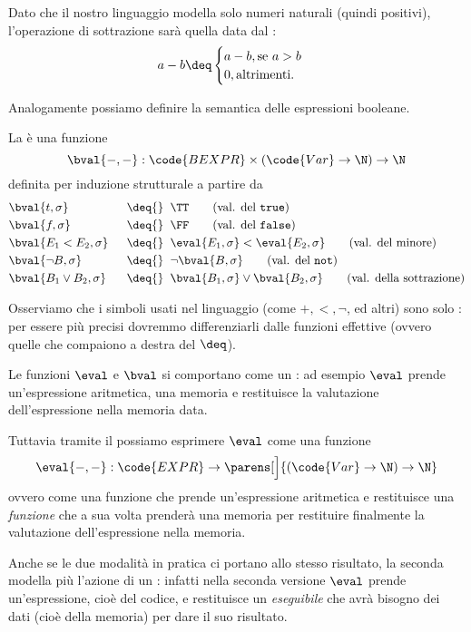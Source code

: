 Dato che il nostro linguaggio modella solo numeri naturali (quindi positivi), l'operazione di sottrazione sarà quella data dal : \[
    a - b \deq \begin{cases}
        a - b, \text{se } a > b\\
        0, \text{altrimenti.}
    \end{cases}
\]

Analogamente possiamo definire la semantica delle espressioni booleane.

\begin{definition}
    La  è una funzione \[
        \bval{\blank, \blank} : \code{BEXPR} \times (\code{Var} \to \N) \to \N
    \] definita per induzione strutturale a partire da
    \begin{alignat*}{2}
        &\bval{t, \sigma} &&\;\;\deq{}\;\; \TT \tag{val. del \texttt{true}}\\
        &\bval{f, \sigma} &&\;\;\deq{}\;\; \FF \tag{val. del \texttt{false}}\\
        &\bval{E_1 < E_2, \sigma} &&\;\;\deq{}\;\; \eval{E_1, \sigma} < \eval{E_2, \sigma} \tag{val. del minore}\\
        &\bval{\neg B, \sigma} &&\;\;\deq{}\;\; \neg \bval{B, \sigma}  \tag{val. del \texttt{not}}\\
        &\bval{B_1 \lor B_2, \sigma} &&\;\;\deq{}\;\; \bval{B_1, \sigma} \lor \bval{B_2, \sigma} \tag{val. della sottrazione}
    \end{alignat*}
\end{definition}

Osserviamo che i simboli usati nel linguaggio (come $+, <, \neg$, ed altri) sono solo : per essere più precisi dovremmo differenziarli dalle funzioni effettive (ovvero quelle che compaiono a destra del $\deq$).

\begin{remark}
    Le funzioni $\eval$ e $\bval$ si comportano come un : ad esempio $\eval$ prende un'espressione aritmetica, una memoria e restituisce la valutazione dell'espressione nella memoria data.

    Tuttavia tramite il  possiamo esprimere $\eval$ come una funzione \[
        \eval{\blank, \blank} : \code{EXPR} \to \parens[\Big]{(\code{Var} \to \N) \to \N}
    \] ovvero come una funzione che prende un'espressione aritmetica e restituisce una \emph{funzione} che a sua volta prenderà una memoria per restituire finalmente la valutazione dell'espressione nella memoria.

    Anche se le due modalità in pratica ci portano allo stesso risultato, la seconda modella più l'azione di un : infatti nella seconda versione $\eval$ prende un'espressione, cioè del codice, e restituisce un \emph{eseguibile} che avrà bisogno dei dati (cioè della memoria) per dare il suo risultato. 
\end{remark}

